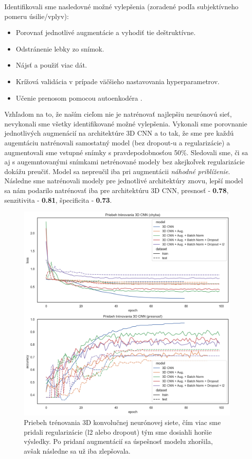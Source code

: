 Identifikovali sme nasledovné možné vylepšenia (zoradené podľa subjektívneho pomeru úsilie/vplyv):
\begin{itemize}
    \item Porovnať jednotlivé augmentácie a vyhodiť tie deštruktívne.
    \item Odstránenie lebky zo snímok.
    \item Nájsť a použiť viac dát.
    \item Krížová validácia v prípade väčšieho nastavovania hyperparametrov.
    \item Učenie prenosom pomocou autoenkodéra \cite{hosseini2016alzheimer}.
\end{itemize}

Vzhľadom na to, že naším cieľom nie je natrénovať najlepšiu neurónovú sieť, nevykonali sme všetky identifikované možné vylepšenia. Vykonali sme porovnanie jednotlivých augmenácií na architektúre 3D CNN a to tak, že sme pre každú augemtáciu natrénovali samostatný model (bez dropout-u a regularizácie) a augmentovali sme vstupné snímky s pravdepodobnosťou 50\%. Sledovali sme, či sa aj s augemntovanými snímkami netrénované modely bez akejkoľvek regularizácie dokážu preučiť. Model sa nepreučil iba pri augmentácii \textit{náhodné priblíženie}. Následne sme natrénovali modely pre jednotlivé architektúry znovu, lepší model sa nám podarilo natrénovať iba pre architektúru 3D CNN, presnosť - \textbf{0.78}, senzitivita - \textbf{0.81}, špecificita - \textbf{0.73}.

\begin{figure}[h!]
    \centering
    \includegraphics[width=14cm]{assets/images/3d_cnn_training.png}
    \caption{Priebeh trénovania 3D konvolučnej neurónovej siete, čím viac sme pridali regularizácie (l2 alebo dropout) tým sme dosiahli horšie výsledky. Po pridaní augmentácií sa úspešnosť modelu zhoršila, avšak následne sa už iba zlepšovala.}
    \label{fig:3d_cnn_training}
\end{figure}

